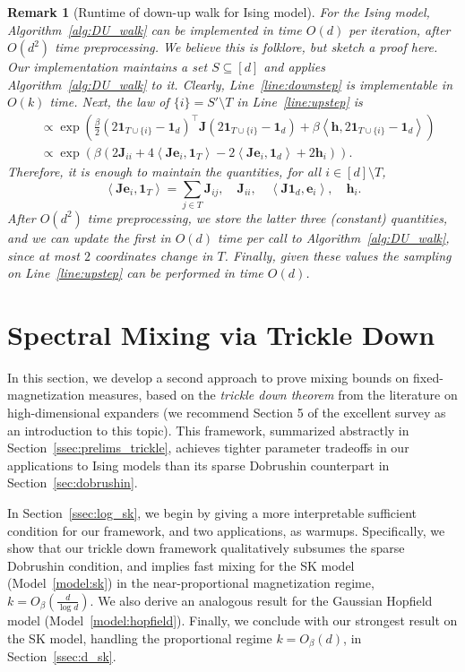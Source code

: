 \documentclass[11pt]{article}
\newtheorem{remark}{Remark}
\newcommand{\inprod}[2]{\left\langle#1, #2\right\rangle}
\newcommand{\1}{\mathbf{1}}
\newcommand{\0}{\mathbf{0}}
\newcommand{\Par}[1]{\left(#1\right)}
\newcommand{\mj}{{\mathbf{J}}}
\newcommand{\ve}{{\mathbf{e}}}
\newcommand{\vh}{{\mathbf{h}}}
\begin{document}
\begin{remark}[Runtime of down-up walk for Ising model]\label{rem:runtime} For the Ising model,
Algorithm~\ref{alg:DU_walk} can be implemented in time $O(d)$ per iteration, after $O(d^2)$ time preprocessing. We believe this is folklore, but sketch a proof here. Our implementation maintains a set $S \subseteq [d]$ and applies Algorithm~\ref{alg:DU_walk} to it. Clearly, Line~\ref{line:downstep} is implementable in $O(k)$ time. Next,  the law of $\{i\} = S' \setminus T$ in Line~\ref{line:upstep} is
\begin{align*}&\propto \exp\Par{\frac \beta 2 \Par{2\1_{T \cup \{i\}} - \1_d}^\top \mj \Par{2\1_{T \cup \{i\}} - \1_d} + \beta \inprod{\vh}{2\1_{T \cup \{i\}} - \1_d}}\\
&\propto \exp\Par{\beta\Par{2\mj_{ii} + 4 \inprod{\mj \ve_i}{\1_T}- 2\inprod{\mj\ve_i}{\1_d} + 2\vh_i}}.
\end{align*}
Therefore, it is enough to maintain the quantities, for all $i \in [d] \setminus T$,
\[\inprod{\mj \ve_i}{\1_T} = \sum_{j \in T} \mj_{ij},\quad\mj_{ii},\quad \inprod{\mj\1_d}{\ve_i}, \quad \vh_i.\]
After $O(d^2)$ time preprocessing, we store the latter three (constant) quantities, and we can update the first in $O(d)$ time per call to Algorithm~\ref{alg:DU_walk}, since at most $2$ coordinates change in $T$. Finally, given these values the sampling on Line~\ref{line:upstep} can be performed in time $O(d)$.
\end{remark}
\section{Spectral Mixing via Trickle Down}\label{sec:trickledown}

In this section, we develop a second approach to prove mixing bounds on fixed-magnetization measures, based on the \emph{trickle down theorem} \cite{oppenheim2018local, alev2020improved} from the literature on high-dimensional expanders (we recommend Section 5 of the excellent survey \cite{gotlib2023nowhere} as an introduction to this topic). This framework, summarized abstractly in Section~\ref{ssec:prelims_trickle}, achieves tighter parameter tradeoffs in our applications to Ising models than its sparse Dobrushin counterpart in Section~\ref{sec:dobrushin}. 

In Section~\ref{ssec:log_sk}, we begin by giving a more interpretable sufficient condition for our framework, and two applications, as warmups. Specifically, we show that our trickle down framework qualitatively subsumes the sparse Dobrushin condition, and implies fast mixing for the SK model (Model~\ref{model:sk}) in the near-proportional magnetization regime, $k = O_\beta( \frac d {\log d})$. We also derive an analogous result for the Gaussian Hopfield model (Model~\ref{model:hopfield}). Finally, we conclude with our strongest result on the SK model, handling the proportional regime $k = O_\beta(d)$, in Section~\ref{ssec:d_sk}.
\end{document}

